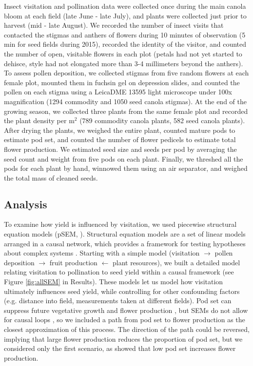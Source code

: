 \documentclass[12pt]{article} %
\begin{document}
Insect visitation and pollination data were collected once during the main canola bloom at each field (late June - late July), and plants were collected just prior to harvest (mid - late August).
We recorded the number of insect visits that contacted the stigmas and anthers of flowers during 10 minutes of observation (5 min for seed fields during 2015), recorded the identity of the visitor, and counted the number of open, visitable flowers in each plot (petals had not yet started to dehisce, style had not elongated more than 3-4 millimeters beyond the anthers).
To assess pollen deposition, we collected stigmas from five random flowers at each female plot, mounted them in fuchsin gel \citep{beattie1971} on depression slides, and counted the pollen on each stigma using a Leica\texttrademark DME 13595 light microscope under 100x magnification (1294 commodity and 1050 seed canola stigmas).
At the end of the growing season, we collected three plants from the same female plot and recorded the plant density per m$^2$ (789 commodity canola plants, 582 seed canola plants).
After drying the plants, we weighed the entire plant, counted mature pods to estimate pod set, and counted the number of flower pedicels to estimate total flower production. %
We estimated seed size and seeds per pod by averaging the seed count and weight from five pods on each plant.
Finally, we threshed all the pods for each plant by hand, winnowed them using an air separator, and weighed the total mass of cleaned seeds. %

\subsection{Analysis}
To examine how yield is influenced by visitation, we used piecewise structural equation models (pSEM, \citealp{shipley2009}).
Structural equation models are a set of linear models arranged in a causal network, which provides a framework for testing hypotheses about complex systems \citep{grace2012, lefcheck2015}.
Starting with a simple model (visitation $\rightarrow$ pollen deposition $\rightarrow$ fruit production $\leftarrow$ plant resources), we built a detailed model relating visitation to pollination to seed yield within a causal framework (see Figure \ref{fig:allSEM} in Results).
These models let us model how visitation ultimately influences seed yield, while controlling for other confounding factors (e.g. distance into field, measurements taken at different fields).
Pod set can suppress future vegetative growth and flower production \citep{stephenson1981}, but SEMs do not allow for causal loops \citep{grace2012}, so we included a path from pod set to flower production as the closest approximation of this process.
The direction of the path could be reversed, implying that large flower production reduces the proportion of pod set, but we considered only the first scenario, as \citet{sabbahi2006} showed that low pod set increases flower production.
\end{document}
